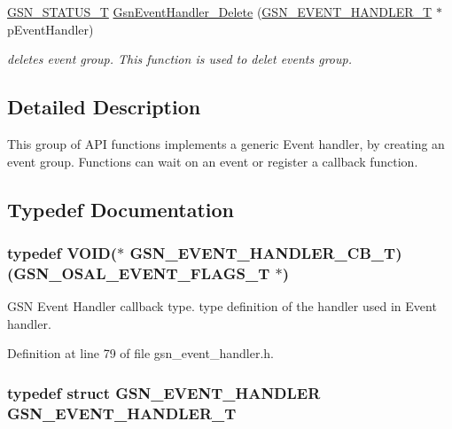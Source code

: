 \begin{DoxyCompactItemize}
\hyperlink{a00659_gae36517c0f5872426a7034c9551eb96ac}{GSN\_\-STATUS\_\-T} \hyperlink{a00622_gaae25cea2c623ec738b13c0b039151e3a}{GsnEventHandler\_\-Delete} (\hyperlink{a00069}{GSN\_\-EVENT\_\-HANDLER\_\-T} $\ast$pEventHandler)
\begin{DoxyCompactList}\small\item\em deletes event group. This function is used to delet events group. \end{DoxyCompactList}\end{DoxyCompactItemize}


\subsection{Detailed Description}
This group of API functions implements a generic Event handler, by creating an event group. Functions can wait on an event or register a callback function. 

\subsection{Typedef Documentation}
\hypertarget{a00622_ga570a795e4730bcaa1c17b58223336526}{
\subsubsection[{GSN\_\-EVENT\_\-HANDLER\_\-CB\_\-T}]{\setlength{\rightskip}{0pt plus 5cm}typedef VOID($\ast$ {\bf GSN\_\-EVENT\_\-HANDLER\_\-CB\_\-T})({\bf GSN\_\-OSAL\_\-EVENT\_\-FLAGS\_\-T} $\ast$)}}
\label{a00622_ga570a795e4730bcaa1c17b58223336526}


GSN Event Handler callback type. type definition of the handler used in Event handler. 



Definition at line 79 of file gsn\_\-event\_\-handler.h.

\hypertarget{a00622_ga6b24ca227651d8ca08bb5e95b709dc49}{
\subsubsection[{GSN\_\-EVENT\_\-HANDLER\_\-T}]{\setlength{\rightskip}{0pt plus 5cm}typedef struct {\bf GSN\_\-EVENT\_\-HANDLER} {\bf GSN\_\-EVENT\_\-HANDLER\_\-T}}}
\label{a00622_ga6b24ca227651d8ca08bb5e95b709dc49}


